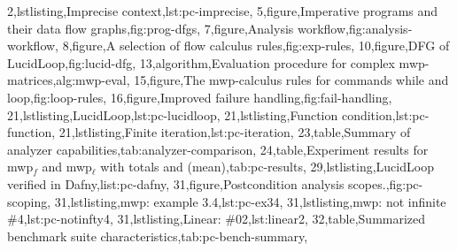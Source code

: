 {        2,lstlisting,{Imprecise context},lst:pc-imprecise,
        5,figure,{Imperative programs and their data flow graphs},fig:prog-dfgs,
        7,figure,{Analysis workflow},fig:analysis-workflow,
        8,figure,{A selection of flow calculus rules},fig:exp-rules,
        10,figure,{DFG of LucidLoop},fig:lucid-dfg,
        13,algorithm,{Evaluation procedure for complex mwp-matrices},alg:mwp-eval,
        15,figure,{The mwp-calculus rules for commands while and loop},fig:loop-rules,
        16,figure,{Improved failure handling},fig:fail-handling,
        21,lstlisting,{LucidLoop},lst:pc-lucidloop,
        21,lstlisting,{Function condition},lst:pc-function,
        21,lstlisting,{Finite iteration},lst:pc-iteration,
        23,table,{Summary of analyzer capabilities},tab:analyzer-comparison,
        24,table,{Experiment results for mwp$_f$ and mwp$_\ell$ with totals and (mean)},tab:pc-results,
        29,lstlisting,{LucidLoop verified in Dafny},list:pc-dafny,
        31,figure,{Postcondition analysis scopes.},fig:pc-scoping,
        31,lstlisting,{mwp: example 3.4},lst:pc-ex34,
        31,lstlisting,{mwp: not infinite \#4},lst:pc-notinfty4,
        31,lstlisting,{Linear: \#02},lst:linear2,
        32,table,{Summarized benchmark suite characteristics},tab:pc-bench-summary},
